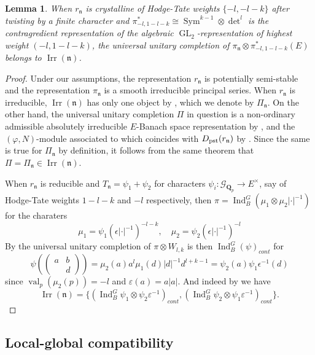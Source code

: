 \documentclass[leqno]{amsart}
\newtheorem{lem}[thm]{Lemma}
\theoremstyle{definition}
\theoremstyle{remark}
\newcommand{\Qp}{\mathbf{Q}_p}
\DeclareMathOperator{\Ind}{Ind}
\DeclareMathOperator{\Sym}{Sym}
\DeclareMathOperator{\GL}{GL}
\DeclareMathOperator{\val}{val}
\newcommand{\pst}{\textnormal{pst}}
\newcommand{\fn}{\mathfrak{n}}
\DeclareMathOperator{\Irr}{Irr}
\newcommand{\Gp}{\mathcal{G}_{\Qp}} %
\begin{document}
\begin{lem}\label{lem:uni_completion}
	When $r_\fn$ is crystalline of
	Hodge-Tate weights $\{-l,-l-k\}$
    after twisting by a finite character
    and $\pi_{-l,1-l-k}^*\cong 
    \Sym^{k-1}\otimes\det^l$ is the contragredient
    representation of the algebraic $\GL_2$-representation
    of highest weight $(-l,1-l-k)$,
	the universal unitary completion of 
	$\pi_\fn\otimes \pi_{-l,1-l-k}^*(E)$ belongs to 
	$\Irr(\fn)$.
\end{lem}
\begin{proof}
    Under our assumptions,
    the representation $r_{\fn}$
    is potentially semi-stable and
    the representation $\pi_{\fn}$
    is a smooth irreducible principal series.
    When $r_\fn$ is irreducible, $\Irr(\fn)$
    has only one object by \cite[Cor 8.14]{pask},
    which we denote by $\Pi_{\fn}$.
    On the other hand,
    the universal unitary completion $\Pi$ in question
    is a non-ordinary admissible absolutely 
    irreducible $E$-Banach space representation
    by \cite[Thm 12.3]{pask},
    and the $(\varphi,N)$-module
    associated to which
    coincides with $D_{\pst}(r_\fn)$
    by \cite[Thm. 1.3]{CDP}.
    Since the same is true for $\Pi_{\fn}$
    by definition,
    it follows from the same theorem
    that $\Pi=\Pi_{\fn}\in \Irr(\fn)$.

	When  $r_\fn$ is reducible
	and $T_\fn=\psi_1+\psi_2$
	for characters
	$\psi_i\colon \Gp\to E^\times$,
	say of Hodge-Tate weights
	$1-l-k$ and  $-l$ respectively,
	then $\pi=\Ind_B^G(\mu_1\otimes\mu_2|\cdot|^{-1})$
	for the charaters
	\[
	\mu_1=\psi_1(\epsilon|\cdot|^{-1})^{-l-k},\quad
	\mu_2=\psi_2(\epsilon|\cdot|^{-1})^{-l}	
	\]
	By \cite[Thm 12.3]{pask} the universal unitary completion
	of $\pi\otimes W_{l,k}$
	is then $\Ind_B^G(\psi)_{cont}$ for
	\[
		\psi( (\begin{smallmatrix}
			a&b\\&d
		\end{smallmatrix}))
		=\mu_2(a)a^l\mu_1(d)|d|^{-1}d^{l+k-1}
		=\psi_2(a)\psi_1\epsilon^{-1}(d)
	\]
	since $\val_p(\mu_2(p))=-l$ and $\varepsilon(a)=a|a|$.
	And indeed by \cite[Cor 8.15]{pask} we have
	\[
	\Irr(\fn)=\{(\Ind_B^G\psi_1\otimes\psi_2\varepsilon^{-1})_{cont},
	(\Ind_B^G\psi_2\otimes\psi_1\varepsilon^{-1})_{cont}\}.
	\]
\end{proof}

\subsection{Local-global compatibility}
\label{sub:compatible}
\end{document}
